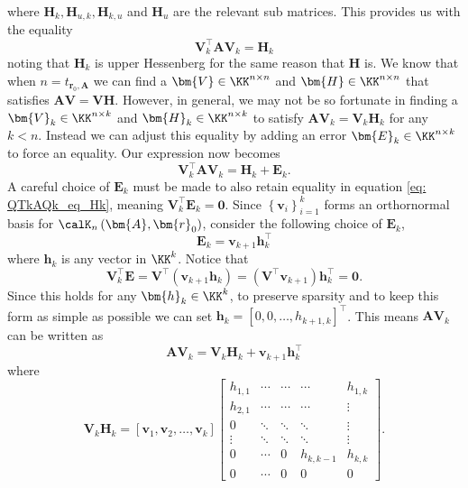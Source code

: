where $\bm{H}_k , \bm{H}_{u,k}, \bm{H}_{k,u}$ and $\bm{H}_u$ are the relevant sub matrices. This provides us with the equality
\begin{equation}\label{eq: QTkAQk_eq_Hk}
    \bm{V}_{k}^{\intercal} \bm{A} \bm{V}_{k} = \bm{H}_k
\end{equation}
noting that $\bm{H}_{k}$ is upper Hessenberg for the same reason that $\bm{H}$ is. We know that when $n = t_{\bm{r}_0, \bm{A}}$ we can find a $\bm{V} \in \KK^{n \times n}$ and $\bm{H} \in \KK^{n \times n}$ that satisfies $\bm{A} \bm{V} = \bm{V} \bm{H}$. However, in general, we may not be so fortunate in finding a $\bm{V}_{k} \in \KK^{n \times k}$ and $\bm{H}_{k} \in \KK^{n \times k}$ to satisfy $\bm{A} \bm{V}_{k} = \bm{V}_{k} \bm{H}_k$ for any $k < n$. Instead we can adjust this equality by adding an error $\bm{E}_k \in \KK^{n \times k}$ to force an equality. Our expression now becomes
\begin{equation}\label{eq: QTkAQk_eq_HkEk}
    \bm{V}_{k}^{\intercal} \bm{A} \bm{V}_{k} = \bm{H}_k + \bm{E}_k.
\end{equation}
A careful choice of $\bm{E}_k$ must be made to also retain equality in equation \ref{eq: QTkAQk_eq_Hk}, meaning $\bm{V}_{k}^{\intercal} \bm{E}_k = \bm{0}$. Since $\left\{ \bm{v}_i \right\}_{i=1}^{k}$ forms an orthornormal basis for $\calK_{n} \left( \bm{A}, \bm{r}_0 \right)$, consider the following choice of $\bm{E}_k$,
\[
    \bm{E}_k = \bm{v}_{k+1} \bm{h}_{k}^{\intercal}
\]
where $\bm{h}_k$ is any vector in $\KK^{k}$. Notice that
\[
    \bm{V}_{k}^{\intercal} \bm{E} = \bm{V}^{\intercal} \left( \bm{v}_{k+1} \bm{h}_k \right) = \left( \bm{V}^{\intercal} \bm{v}_{k+1} \right) \bm{h}_{k}^{\intercal} = \bm{0}.
\]
Since this holds for any $\bm{h}_k \in \KK^{k}$, to preserve sparsity and to keep this form as simple as possible we can set $\bm{h}_k = \left[ 0,0, \ldots , h_{k+1,k} \right]^{\intercal}$. This means $\bm{A} \bm{V}_k$ can be written as
\begin{equation}\label{eq: QTkAQk_eq_Hk_p_qkhk}
    \bm{A} \bm{V}_k =  \bm{V}_k \bm{H}_k + \bm{v}_{k+1} \bm{h}_{k}^{\intercal}
\end{equation}
where
\[
    \bm{V}_k \bm{H}_k =
    \left[ \bm{v}_1 , \bm{v}_2 , \ldots , \bm{v}_k \right]
    \begin{bmatrix}
        h_{1,1} & \cdots & \cdots & \cdots    & h_{1,k} \\
        h_{2,1} & \cdots & \cdots & \cdots    & \vdots  \\
        0       & \ddots & \ddots & \ddots    & \vdots  \\
        \vdots  & \ddots & \ddots & \ddots    & \vdots  \\
        0       & \cdots & 0      & h_{k,k-1} & h_{k,k} \\
        0       & \cdots & 0      & 0         & 0
    \end{bmatrix}.
\]

